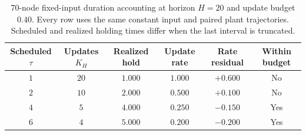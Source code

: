 \begin{table}[tbp]
\caption{70-node fixed-input duration accounting at horizon $H=20$ and update budget $0.40$. Every row uses the same constant input and paired plant trajectories. Scheduled and realized holding times differ when the last interval is truncated.}
\label{comp:tab:persistent_duration_accounting}
\centering
\begingroup\small
\begin{tabular*}{\linewidth}{@{\extracolsep{\fill}}cccccc@{}}
\toprule
Scheduled $\tau$ & Updates $K_H$ & Realized hold & Update rate & Rate residual & Within budget \\
\midrule
$1$ & $20$ & $1.000$ & $1.000$ & $+0.600$ & No \\
$2$ & $10$ & $2.000$ & $0.500$ & $+0.100$ & No \\
$4$ & $5$ & $4.000$ & $0.250$ & $-0.150$ & Yes \\
$6$ & $4$ & $5.000$ & $0.200$ & $-0.200$ & Yes \\
\bottomrule
\end{tabular*}
\endgroup
\end{table}
